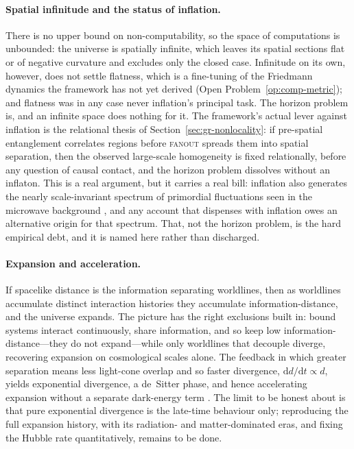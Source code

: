 \paragraph{Spatial infinitude and the status of inflation.}
There is no upper bound on non-computability, so the space of computations is
unbounded: the universe is spatially infinite, which leaves its spatial sections flat or of
negative curvature and excludes only the closed case. Infinitude on its own, however, does not
settle flatness, which is a fine-tuning of the Friedmann dynamics the framework has not yet
derived (Open Problem~\ref{op:comp-metric}); and flatness was in any case never inflation's
principal task. The horizon problem is, and an infinite space does nothing for it. The framework's actual lever against
inflation is the relational thesis of Section~\ref{sec:gr-nonlocality}: if
pre-spatial entanglement correlates regions before \textsc{fanout} spreads them
into spatial separation, then the observed large-scale homogeneity is fixed
relationally, before any question of causal contact, and the horizon problem
dissolves without an inflaton. This is a real argument, but it carries a real
bill: inflation also generates the nearly scale-invariant spectrum of primordial
fluctuations seen in the microwave background \autocite{Planck2020}, and any
account that dispenses with inflation owes an alternative origin for that
spectrum. That, not the horizon problem, is the hard empirical debt, and it is
named here rather than discharged.

\paragraph{Expansion and acceleration.}
If spacelike distance is the information separating worldlines, then as worldlines
accumulate distinct interaction histories they accumulate information-distance,
and the universe expands. The picture has the right exclusions built in: bound
systems interact continuously, share information, and so keep low
information-distance---they do not expand---while only worldlines that decouple
diverge, recovering expansion on cosmological scales alone. The feedback in which
greater separation means less light-cone overlap and so faster divergence,
$\mathrm{d}d/\mathrm{d}t \propto d$, yields exponential divergence, a de~Sitter
phase, and hence accelerating expansion without a separate dark-energy term
\autocite{Riess1998}. The limit to be honest about is that pure exponential
divergence is the late-time behaviour only; reproducing the full expansion history,
with its radiation- and matter-dominated eras, and fixing the Hubble rate
quantitatively, remains to be done.

